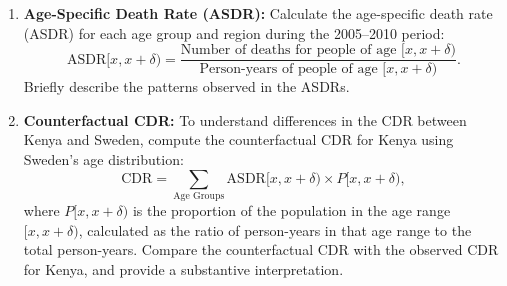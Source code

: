 \documentclass[12pt]{article}
\begin{document}
\begin{enumerate}
    \item \textbf{Age-Specific Death Rate (ASDR):} Calculate the age-specific death rate (ASDR) for each age group and region during the 2005–2010 period:
    \[
    \text{ASDR}[x, x+\delta) = \frac{\text{Number of deaths for people of age } [x, x+\delta)}{\text{Person-years of people of age } [x, x+\delta)}.
    \]
    Briefly describe the patterns observed in the ASDRs.

    \item \textbf{Counterfactual CDR:} To understand differences in the CDR between Kenya and Sweden, compute the counterfactual CDR for Kenya using Sweden's age distribution:
    \[
    \text{CDR} = \sum_{\text{Age Groups}} \text{ASDR}[x, x+\delta) \times P[x, x+\delta),
    \]
    where $P[x, x+\delta)$ is the proportion of the population in the age range $[x, x+\delta)$, calculated as the ratio of person-years in that age range to the total person-years. Compare the counterfactual CDR with the observed CDR for Kenya, and provide a substantive interpretation.
\end{enumerate}
\end{document}
